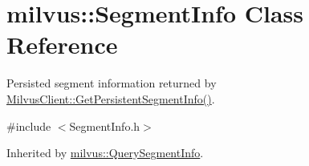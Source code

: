 \hypertarget{classmilvus_1_1_segment_info}{}\section{milvus\+:\+:Segment\+Info Class Reference}
\label{classmilvus_1_1_segment_info}


Persisted segment information returned by \hyperlink{classmilvus_1_1_milvus_client_a383e2ef16d4add6af450170775869604}{Milvus\+Client\+::\+Get\+Persistent\+Segment\+Info()}.  




{\ttfamily \#include $<$Segment\+Info.\+h$>$}



Inherited by \hyperlink{classmilvus_1_1_query_segment_info}{milvus\+::\+Query\+Segment\+Info}.

